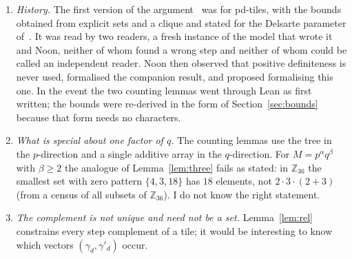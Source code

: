 \documentclass[11pt,a4paper]{amsart}
\theoremstyle{definition}
\theoremstyle{remark}
\newcommand{\Z}{\mathbb{Z}}
\newcommand{\gs}{\gamma}
\newcommand{\gd}{\gamma'}
\begin{document}
\begin{enumerate}
\item \emph{History.} The first version of the argument~\cite{Ynote} was for pd-tiles, with the bounds
obtained from explicit sets and a clique and stated for the Delsarte parameter of~\cite{KLMS}. It was read by
two readers, a fresh instance of the model that wrote it and Noon, neither of whom found a wrong step and
neither of whom could be called an independent reader. Noon then observed that positive definiteness is never used, formalised the
companion result, and proposed formalising this one. In the event the two counting lemmas went through Lean
as first written; the bounds were re-derived in the form of Section~\ref{sec:bounds} because that form needs
no characters.
\item \emph{What is special about one factor of $q$.} The counting lemmas use the tree in the $p$-direction
and a single additive array in the $q$-direction. For $M=p^\alpha q^\beta$ with $\beta\ge2$ the analogue of
Lemma~\ref{lem:three} fails as stated: in $\Z_{36}$ the smallest set with zero pattern $\{4,3,18\}$ has
$18$ elements, not $2\cdot3\cdot(2+3)$ (from a census of all subsets of $\Z_{36}$). I do not know the right
statement.
\item \emph{The complement is not unique and need not be a set.} Lemma~\ref{lem:rel} constrains every step
complement of a tile; it would be interesting to know which vectors $(\gs_d,\gd_d)$ occur.
\end{enumerate}
\end{document}
